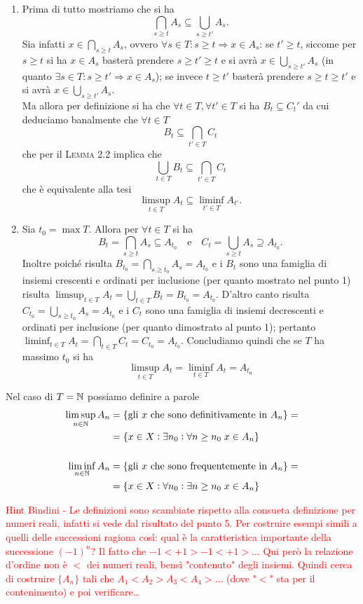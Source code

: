 \documentclass[a4paper]{article}\par \usepackage{style}\par
\begin{document}
\begin{enumerate}
\item Prima di tutto mostriamo che si ha \[\bigcap_{s \geq t} A_s \subseteq \bigcup_{s \geq t'} A_s.\] Sia infatti $ x \in \bigcap_{s \geq t} A_s $, ovvero $ \forall s \in T : s \geq t \Rightarrow x \in A_s $: se $ t' \geq t $, siccome per $ s \geq t $ si ha $ x \in A_s $ basterà prendere $ s \geq t' \geq t $ e si avrà $ x \in \bigcup_{s \geq t'} A_s  $ (in quanto $ \exists s \in T: s \geq t' \Rightarrow x \in A_s $); se invece $ t \geq t' $ basterà prendere $ s \geq t \geq t' $ e si avrà $ x \in \bigcup_{s \geq t'} A_s  $.\\
  Ma allora per definizione si ha che $ \forall t \in T , \forall t' \in T $ si ha $ B_t \subseteq C_t' $ da cui deduciamo banalmente che $ \forall t \in T $ \[B_t \subseteq \bigcap_{t' \in T} C_t\] che per il \textsc{Lemma 2.2} implica che \[\bigcup_{t \in T} B_t \subseteq \bigcap_{t' \in T} C_t\] che è equivalente alla tesi \[\limsup_{t \in T} A_t \subseteq \liminf_{t' \in T} A_{t'}.\]
\item Sia $ t_0 = \max T $. Allora per $ \forall t \in T $ si ha \[B_t = \bigcap_{s \geq t} A_s \subseteq A_{t_0} \quad \mathrm{e} \quad C_t = \bigcup_{s \geq t} A_s \supseteq A_{t_0}.\] Inoltre poiché risulta $ B_{t_0} = \bigcap_{s \geq t_0} A_s = A_{t_0} $ e i $ B_t $ sono una famiglia di insiemi crescenti e ordinati per inclusione (per quanto mostrato nel punto 1) risulta $ \limsup_{t \in T} A_t = \bigcup_{t \in T} B_t = B_{t_0} = A_{t_0} $. D'altro canto risulta $ C_{t_0} = \bigcup_{s \geq t_0} A_s = A_{t_0} $ e i $ C_t $ sono una famiglia di insiemi decrescenti e ordinati per inclusione (per quanto dimostrato al punto 1); pertanto $ \liminf_{t \in T} A_t = \bigcap_{t \in T} C_t = C_{t_0} = A_{t_0} $. Concludiamo quindi che se $ T $ ha massimo $ t_0 $ si ha \[\limsup_{t \in T} A_t = \liminf_{t \in T} A_t = A_{t_0}\]
\end{enumerate}
Nel caso di $ T = \mathbb{N} $ possiamo definire a parole
\begin{align*}
  \limsup_{n \in \mathbb{N}} A_n & = \{\text{gli $ x $ che sono definitivamente in $ A_n $}\} = \\
                         & = \{x \in X : \exists n_0 : \forall n \geq n_0 \; x \in A_n\} \\
                         & \\
  \liminf_{n \in \mathbb{N}} A_n & = \{\text{gli $ x $ che sono frequentemente in $ A_n $}\} = \\
                         & = \{x \in X : \forall n_0 : \exists n \geq n_0 \; x \in A_n\}\\
\end{align*}\par \textcolor{red}{Hint Bindini -  Le definizioni sono scambiate rispetto alla consueta definizione per numeri reali, infatti si vede dal risultato del punto 5. Per costruire esempi simili a quelli delle successioni ragiona così: qual è la caratteristica importante della successione $ (-1)^n $? Il fatto che $ -1 < +1 > -1 < +1 > \ldots $ Qui però la relazione d'ordine non è $ < $ dei numeri reali, bensì "contenuto" degli insiemi. Quindi cerca di costruire $ \{A_n\} $ tali che $ A_1 < A_2 > A_3 < A_4 > \ldots $ (dove "$ < $" sta per il contenimento) e poi verificare\ldots}\par 
\end{document}
